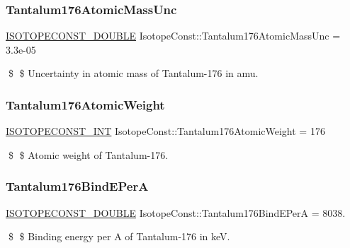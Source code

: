 \subsubsection{\texorpdfstring{Tantalum176\+Atomic\+Mass\+Unc}{Tantalum176AtomicMassUnc}}
{\footnotesize\ttfamily \mbox{\hyperlink{group___isotope_const-_macros_ga8f45a7272ce02c0b4c65c44636ed719a}{I\+S\+O\+T\+O\+P\+E\+C\+O\+N\+S\+T\+\_\+\+D\+O\+U\+B\+LE}} Isotope\+Const\+::\+Tantalum176\+Atomic\+Mass\+Unc = 3.\+3e-\/05}

\$ \$ Uncertainty in atomic mass of Tantalum-\/176 in amu. \mbox{\label{group___isotope_const-_tantalum-_ta176_gaa1193fb8508c77629e50bab7400592b4}} 
\subsubsection{\texorpdfstring{Tantalum176\+Atomic\+Weight}{Tantalum176AtomicWeight}}
{\footnotesize\ttfamily \mbox{\hyperlink{group___isotope_const-_macros_ga5f18360b3e99483a35c32d789e62621c}{I\+S\+O\+T\+O\+P\+E\+C\+O\+N\+S\+T\+\_\+\+I\+NT}} Isotope\+Const\+::\+Tantalum176\+Atomic\+Weight = 176}

\$ \$ Atomic weight of Tantalum-\/176. \mbox{\label{group___isotope_const-_tantalum-_ta176_gaaefef8c8aef0631d3b30012daf4dcbb1}} 
\subsubsection{\texorpdfstring{Tantalum176\+Bind\+E\+PerA}{Tantalum176BindEPerA}}
{\footnotesize\ttfamily \mbox{\hyperlink{group___isotope_const-_macros_ga8f45a7272ce02c0b4c65c44636ed719a}{I\+S\+O\+T\+O\+P\+E\+C\+O\+N\+S\+T\+\_\+\+D\+O\+U\+B\+LE}} Isotope\+Const\+::\+Tantalum176\+Bind\+E\+PerA = 8038.}

\$ \$ Binding energy per A of Tantalum-\/176 in keV. \mbox{\label{group___isotope_const-_tantalum-_ta176_gaef6b56f90b7c50ceec55c8f3642f2113}} 
